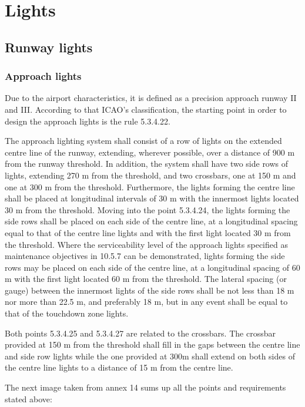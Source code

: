 \chapter{Lights} %

	\section{Runway lights}
		\subsection{Approach lights}
		Due to the airport characteristics, it is defined as a precision approach runway II and III. According to that ICAO's classification, the starting point in order to design the approach lights is the rule 5.3.4.22. 
		
		The approach lighting system shall consist of a row of lights on the extended centre line of the runway,
		extending, wherever possible, over a distance of 900 m from the runway threshold. In addition, the system shall have two
		side rows of lights, extending 270 m from the threshold, and two crossbars, one at 150 m and one at 300 m from the threshold. Furthermore, the lights forming the centre line shall be placed at longitudinal intervals of 30 m with the innermost lights
		located 30 m from the threshold. 
		Moving into the point 5.3.4.24, the lights forming the side rows shall be placed on each side of the centre line, at a longitudinal spacing equal to that of the centre line lights and with the first light located 30 m from the threshold. Where the serviceability level of the approach lights specified as maintenance objectives in 10.5.7 can be demonstrated, lights forming the side rows may be placed on each side of the centre line, at a longitudinal spacing of 60 m with the first light located 60 m from the threshold. The lateral spacing (or gauge) between the innermost lights of the side rows shall be not less than 18 m nor more than 22.5 m, and preferably 18 m, but in any event shall be equal to that of the touchdown zone lights.
		
		Both points 5.3.4.25 and 5.3.4.27 are related to the crossbars. The crossbar provided at 150 m from the threshold shall fill in the gaps between the centre line and side row lights while the one provided at 300m shall extend on both sides of the centre line lights to a distance of 15 m from the centre line.
		
		The next image taken from annex 14 sums up all the points and requirements stated above: 
		
